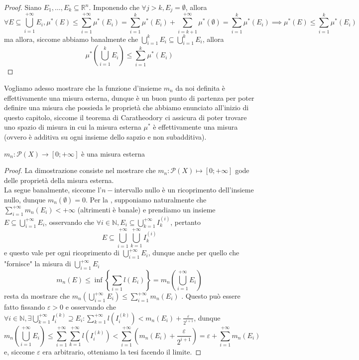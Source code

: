 \begin{proof}
	Siano $E_1, \ldots, E_k \subseteq \mathbb{R}^n$. Imponendo che $\forall j > k, E_j = \emptyset$, allora
	$$
	\forall E \subseteq \bigcup_{i=1}^{+\infty} E_i, \mu^*(E) \leq \sum_{i=1}^{+\infty} \mu^*(E_i) = \sum\limits_{i=1}^{k} \mu^*(E_i) + \sum\limits_{i=k+1}^{+\infty} \mu^*(\emptyset) = \sum\limits_{i=1}^k \mu^*(E_i) \implies \mu^*(E) \leq \sum_{i=1}^k \mu^*(E_i)
	$$
	ma allora, siccome abbiamo banalmente che $\bigcup\limits_{i=1}^{k} E_i \subseteq \bigcup\limits_{i=1}^k E_i$, allora
	$$
	\mu^* \left( \bigcup_{i=1}^k E_i \right) \leq \sum_{i=1}^k \mu^*(E_i)
	$$
\end{proof}
Vogliamo adesso mostrare che la funzione d'insieme $m_n$ da noi definita è effettivamente una misura esterna, dunque è un buon punto di partenza per poter definire una misura che possieda le proprietà che abbiamo enunciato all'inizio di questo capitolo, siccome il teorema di 
Caratheodory ci assicura di poter trovare uno spazio di misura in cui la misura esterna $\mu^*$ è effettivamente una misura (ovvero è additiva su ogni insieme dello sapzio e non subadditiva).
\begin{prop}
	$m_n: \mathcal{P}(X) \to [0; +\infty]$ è una misura esterna
	\label{prop:lebesgue_mis_esterna}
\end{prop}
\begin{proof}
	La dimostrazione consiste nel mostrare che $m_n: \mathcal{P}(X) \mapsto [0; +\infty]$ gode delle proprietà della misura esterna. \\
	La  segue banalmente, siccome l'$n-$intervallo nullo è un ricoprimento dell'insieme nullo, dunque $m_n(\emptyset) = 0$.
	Per la , supponiamo naturalmente che $\sum\limits_{i=1}^{+\infty} m_n(E_i) < +\infty$ (altrimenti è banale) e prendiamo un insieme $E \subseteq \bigcup\limits_{i=1}^{+\infty} E_i$, osservando che $\forall i \in \mathbb{N}, E_i \subseteq \bigcup\limits_{k=1}^{+\infty} I_{k}^{(i)}$, pertanto
	$$
		E \subseteq \bigcup_{i=1}^{+\infty} \bigcup_{k=1}^{+\infty} I_k^{(i)}
	$$
	e questo vale per ogni ricoprimento di $\bigcup\limits_{i=1}^{+\infty} E_i$, dunque anche per quello che "fornisce" la misura di $\bigcup\limits_{i=1}^{+\infty} E_i$
	$$
		m_n(E) \leq \inf \left\{\sum_{i=1} l(E_i) \right\} = m_n \left( \bigcup_{i=1}^{+\infty} E_i \right)
	$$
	resta da mostrare che $m_n( \bigcup\limits_{i=1}^{+\infty} E_i ) \leq \sum\limits_{i=1}^{+\infty} m_n(E_i)$ . Questo può essere fatto fissando $\varepsilon > 0$ e osservando che $\forall i \in \mathbb{N}, \exists \bigcup\limits_{k=1}^{+\infty} I_{i}^{(k)} \supseteq E_i : \sum\limits_{k=1}^{+\infty} l(I_i^{(k)}) < m_n(E_i) + \frac{\varepsilon}{2^{i+1}}$, dunque
	$$
	m_n \left( \bigcup_{i=1}^{+\infty} E_i \right) \leq \sum_{i=1}^{+\infty} \sum_{k=1}^{+\infty} l(I_{i}^{(k)}) < \sum_{i=1}^{+\infty} (m_n(E_i) + \frac{\varepsilon}{2^{i+1}}) = \varepsilon + \sum_{i=1}^{+\infty} m_n(E_i)
	$$
	e, siccome $\varepsilon$ era arbitrario, otteniamo la tesi facendo il limite.
\end{proof}
